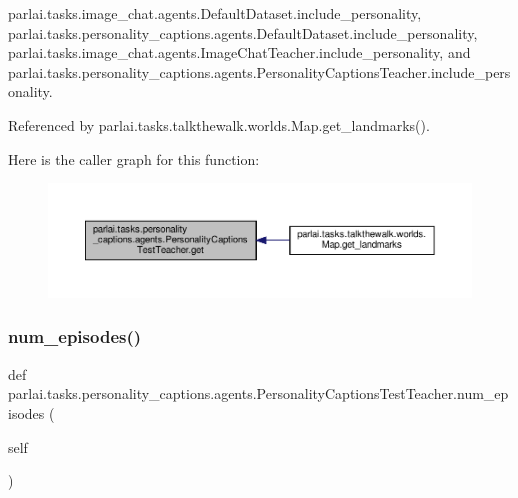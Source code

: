 parlai.\+tasks.\+image\+\_\+chat.\+agents.\+Default\+Dataset.\+include\+\_\+personality, parlai.\+tasks.\+personality\+\_\+captions.\+agents.\+Default\+Dataset.\+include\+\_\+personality, parlai.\+tasks.\+image\+\_\+chat.\+agents.\+Image\+Chat\+Teacher.\+include\+\_\+personality, and parlai.\+tasks.\+personality\+\_\+captions.\+agents.\+Personality\+Captions\+Teacher.\+include\+\_\+personality.



Referenced by parlai.\+tasks.\+talkthewalk.\+worlds.\+Map.\+get\+\_\+landmarks().

Here is the caller graph for this function\+:
\nopagebreak
\begin{figure}[H]
\begin{center}
\leavevmode
\includegraphics[width=350pt]{classparlai_1_1tasks_1_1personality__captions_1_1agents_1_1PersonalityCaptionsTestTeacher_a07f538c8c1ff16a9d08b78d1ea3ef1f8_icgraph}
\end{center}
\end{figure}
\mbox{\label{classparlai_1_1tasks_1_1personality__captions_1_1agents_1_1PersonalityCaptionsTestTeacher_abd4a7d0a0310ae93861f1e3e70e02260}} 
\subsubsection{\texorpdfstring{num\+\_\+episodes()}{num\_episodes()}}
{\footnotesize\ttfamily def parlai.\+tasks.\+personality\+\_\+captions.\+agents.\+Personality\+Captions\+Test\+Teacher.\+num\+\_\+episodes (\begin{DoxyParamCaption}\item[{}]{self }\end{DoxyParamCaption})}

